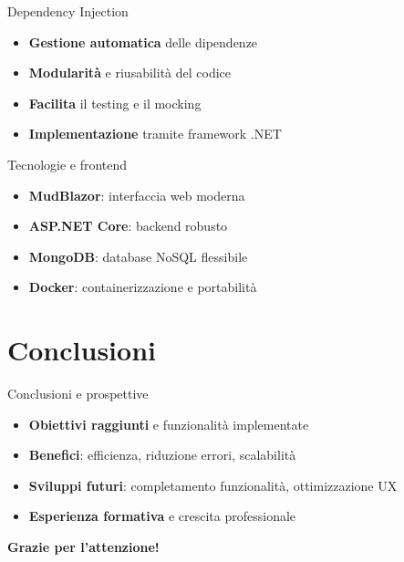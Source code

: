 \documentclass{beamer}
\begin{document}
\begin{frame}{Dependency Injection}
    \begin{itemize}
        \item \textbf{Gestione automatica} delle dipendenze
        \item \textbf{Modularità} e riusabilità del codice
        \item \textbf{Facilita} il testing e il mocking
        \item \textbf{Implementazione} tramite framework .NET
    \end{itemize}
\end{frame}

\begin{frame}{Tecnologie e frontend}
    \begin{itemize}
        \item \textbf{MudBlazor}: interfaccia web moderna
        \item \textbf{ASP.NET Core}: backend robusto
        \item \textbf{MongoDB}: database NoSQL flessibile
        \item \textbf{Docker}: containerizzazione e portabilità
    \end{itemize}
\end{frame}

\section{Conclusioni}
\begin{frame}{Conclusioni e prospettive}
    \begin{itemize}
        \item \textbf{Obiettivi raggiunti} e funzionalità implementate
        \item \textbf{Benefici}: efficienza, riduzione errori, scalabilità
        \item \textbf{Sviluppi futuri}: completamento funzionalità, ottimizzazione UX
        \item \textbf{Esperienza formativa} e crescita professionale
    \end{itemize}
\end{frame}

\begin{emptyframe}
    \centering
    \textbf{Grazie per l'attenzione!}
\end{emptyframe}
\end{document}
